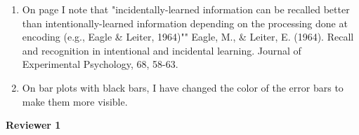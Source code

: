 \documentclass[12pt]{article}
\begin{document}
\begin{enumerate}
\item
	On page \pageref{TODO-13} I note that "incidentally-learned information can be recalled better than intentionally-learned information depending on the processing done at encoding (e.g., Eagle \& Leiter, 1964)""
	Eagle, M., \& Leiter, E. (1964). Recall and recognition in intentional and incidental learning. Journal of Experimental Psychology, 68, 58-63.

\item
	\pageref{TODO-14} On bar plots with black bars, I have changed the color of the error bars to make them more visible. 


\end{enumerate}


\vspace{20pt}

\textbf{\large{Reviewer 1}}
\end{document}
